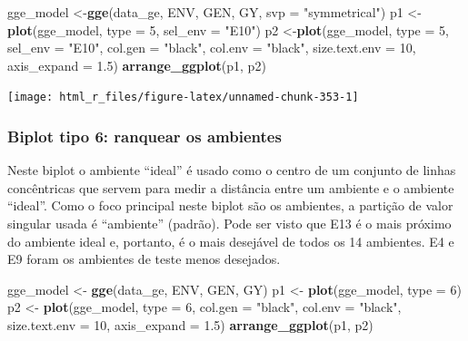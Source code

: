 \documentclass[
]{book}
\newenvironment{Shaded}{\begin{snugshade}}{\end{snugshade}}
\newcommand{\DataTypeTok}[1]{\textcolor[rgb]{0.13,0.29,0.53}{#1}}
\newcommand{\DecValTok}[1]{\textcolor[rgb]{0.00,0.00,0.81}{#1}}
\newcommand{\FloatTok}[1]{\textcolor[rgb]{0.00,0.00,0.81}{#1}}
\newcommand{\KeywordTok}[1]{\textcolor[rgb]{0.13,0.29,0.53}{\textbf{#1}}}
\newcommand{\NormalTok}[1]{#1}
\newcommand{\StringTok}[1]{\textcolor[rgb]{0.31,0.60,0.02}{#1}}
\numberwithin{equation}{section}
\newcommand{\indt}[1]{\index{#1|ST}}
\begin{document}
\begin{Shaded}
\begin{Highlighting}[]
\NormalTok{gge\_model \textless{}{-}}\KeywordTok{gge}\NormalTok{(data\_ge, ENV, GEN, GY, }\DataTypeTok{svp =} \StringTok{"symmetrical"}\NormalTok{)}
\NormalTok{p1 \textless{}{-}}\KeywordTok{plot}\NormalTok{(gge\_model, }\DataTypeTok{type =} \DecValTok{5}\NormalTok{, }\DataTypeTok{sel\_env =} \StringTok{"E10"}\NormalTok{)}
\NormalTok{p2 \textless{}{-}}\KeywordTok{plot}\NormalTok{(gge\_model,}
          \DataTypeTok{type =} \DecValTok{5}\NormalTok{,}
          \DataTypeTok{sel\_env =} \StringTok{"E10"}\NormalTok{,}
          \DataTypeTok{col.gen =} \StringTok{"black"}\NormalTok{,}
          \DataTypeTok{col.env =} \StringTok{"black"}\NormalTok{,}
          \DataTypeTok{size.text.env =} \DecValTok{10}\NormalTok{,}
          \DataTypeTok{axis\_expand =} \FloatTok{1.5}\NormalTok{)}
\KeywordTok{arrange\_ggplot}\NormalTok{(p1, p2)}
\end{Highlighting}
\end{Shaded}

\begin{center}\texttt{[image: html\_r\_files/figure-latex/unnamed-chunk-353-1]} \end{center}

\hypertarget{biplot-tipo-6-ranquear-os-ambientes}{%
\subsubsection{Biplot tipo 6: ranquear os ambientes}\label{biplot-tipo-6-ranquear-os-ambientes}}

Neste biplot o ambiente ``ideal'' é usado como o centro de um conjunto de linhas concêntricas que servem para medir a distância entre um ambiente e o ambiente ``ideal''. Como o foco principal neste biplot são os ambientes, a partição de valor singular usada é ``ambiente'' (padrão). Pode ser visto que E13 é o mais próximo do ambiente ideal e, portanto, é o mais desejável de todos os 14 ambientes. E4 e E9 foram os ambientes de teste menos desejados.
\indt{biplot}

\begin{Shaded}
\begin{Highlighting}[]
\NormalTok{gge\_model \textless{}{-}}\StringTok{ }\KeywordTok{gge}\NormalTok{(data\_ge, ENV, GEN, GY)}
\NormalTok{p1 \textless{}{-}}\StringTok{ }\KeywordTok{plot}\NormalTok{(gge\_model, }\DataTypeTok{type =} \DecValTok{6}\NormalTok{)}
\NormalTok{p2 \textless{}{-}}\StringTok{ }\KeywordTok{plot}\NormalTok{(gge\_model,}
           \DataTypeTok{type =} \DecValTok{6}\NormalTok{,}
           \DataTypeTok{col.gen =} \StringTok{"black"}\NormalTok{,}
           \DataTypeTok{col.env =} \StringTok{"black"}\NormalTok{,}
           \DataTypeTok{size.text.env =} \DecValTok{10}\NormalTok{,}
           \DataTypeTok{axis\_expand =} \FloatTok{1.5}\NormalTok{)}
\KeywordTok{arrange\_ggplot}\NormalTok{(p1, p2)}
\end{Highlighting}
\end{Shaded}
\end{document}
